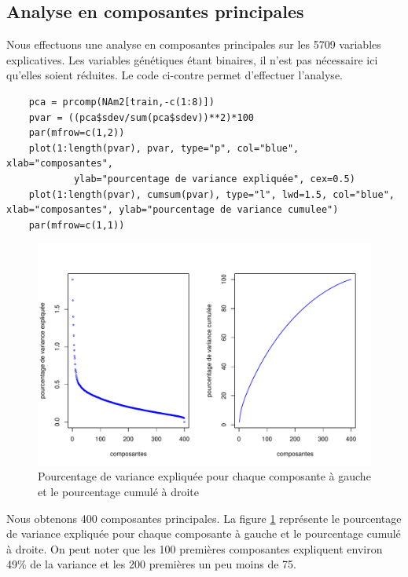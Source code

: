 \documentclass[12pt,a4paper]{article}
\begin{document}
\subsection{Analyse en composantes principales}
Nous effectuons une analyse en composantes principales sur les 5709 variables explicatives. Les variables génétiques étant binaires, il n'est pas nécessaire ici qu'elles soient réduites. Le code ci-contre permet d'effectuer l'analyse. \vspace{2mm}
\begin{lstlisting}
	pca = prcomp(NAm2[train,-c(1:8)])
	pvar = ((pca$sdev/sum(pca$sdev))**2)*100
	par(mfrow=c(1,2))
	plot(1:length(pvar), pvar, type="p", col="blue", xlab="composantes",
			ylab="pourcentage de variance expliquée", cex=0.5)
	plot(1:length(pvar), cumsum(pvar), type="l", lwd=1.5, col="blue", xlab="composantes", ylab="pourcentage de variance cumulee")
	par(mfrow=c(1,1))
\end{lstlisting}
\begin{figure}[h!]
	\begin{center}
		\includegraphics[scale=0.7]{figures/pca_plot.pdf}
		\caption{Pourcentage de variance expliquée pour chaque composante à gauche et le pourcentage cumulé à droite}
		\label{fig:acp_plot}
	\end{center}
\end{figure}
Nous obtenons 400 composantes principales. La figure \ref{fig:acp_plot}
représente le pourcentage de variance expliquée pour chaque composante à gauche
et le pourcentage cumulé à droite. On peut noter que les 100 premières
composantes expliquent environ 49\% de la variance et les 200 premières un peu
moins de 75.  
\end{document}
